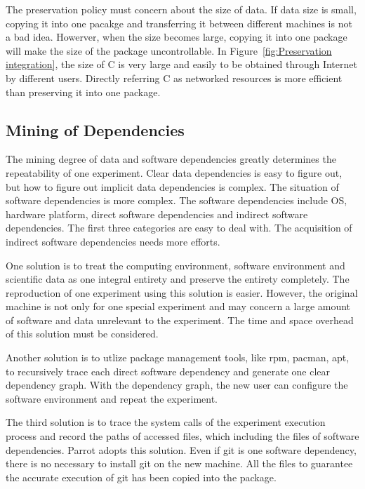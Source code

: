 \documentclass{sig-alternate}
\begin{document}
The preservation policy must concern about the size of data. If data size is
small, copying it into one pacakge and transferring it between different
machines is not a bad idea. Howerver, when the size becomes large, copying it
into one package will make the size of the package uncontrollable. In
Figure~\ref{fig:Preservation integration}, the size of C is very large and
easily to be obtained through Internet by different users. Directly referring C
as networked resources is more efficient than preserving it into one package.

\subsection{Mining of Dependencies} 

The mining degree of data and software dependencies greatly determines the
repeatability of one experiment. Clear data dependencies is easy to figure
out, but how to figure out implicit data dependencies is complex. The situation
of software dependencies is more complex. The software dependencies include OS,
hardware platform, direct software dependencies and indirect software
dependencies.
The first
three categories are easy to deal with. The acquisition of indirect software
dependencies needs more efforts. 

One solution is to treat the computing environment, software environment
and scientific data as one integral entirety and preserve the entirety
completely. The reproduction of one experiment using this solution is easier.
However, the original machine is not only for one special experiment and may
concern a large amount of software and data unrelevant to the experiment. The
time and space overhead of this solution must be considered.

Another solution is to utlize package management
tools, like rpm, pacman, apt, to recursively trace each direct software
dependency and generate one clear dependency graph. With the dependency graph,
the new user can configure the software environment and repeat the experiment.

The third solution is to trace the system calls of the experiment execution process
and record the paths of accessed files, which including the files of software dependencies.
Parrot adopts this solution. Even if git is one software dependency, there is no necessary to install git on the new machine.
All the files to guarantee the accurate execution of git has been copied into the package.

\end{document}
